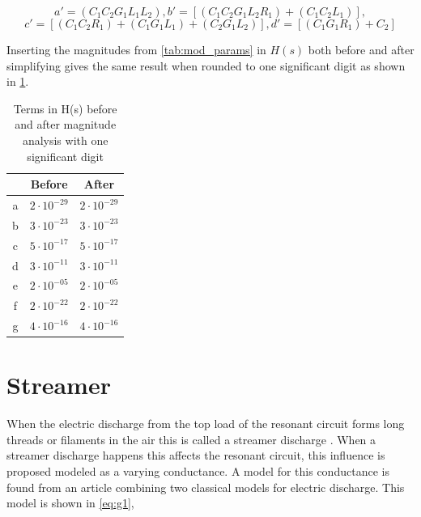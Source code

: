\begin{equation} \label{eq:ab_simp}
    a' = (C_1 C_2 G_1 L_1 L_2), b' = [(C_1 C_2 G_1 L_2 R_1)+(C_1 C_2 L_1)],
\end{equation}
\begin{equation} \label{eq:cd_simp}
    c' = [(C_1 C_2 R_1)+(C_1 G_1 L_1)+(C_2 G_1 L_2)], d' = [(C_1 G_1 R_1) + C_2]
\end{equation}

Inserting the magnitudes from \cref{tab:mod_params} in $H(s)$ both before and after simplifying gives the same result when rounded to one significant digit as shown in \cref{tab:beforeafter}.

\begin{table}[h!]
    \centering
    \begin{tabular}{c|c|c}
          & Before             & After \\ \hline
        a & $2 \cdot 10^{-29}$ & $2 \cdot 10^{-29}$ \\
        b & $3 \cdot 10^{-23}$ & $3 \cdot 10^{-23}$ \\
        c & $5 \cdot 10^{-17}$ & $5 \cdot 10^{-17}$ \\
        d & $3 \cdot 10^{-11}$ & $3 \cdot 10^{-11}$ \\
        e & $2 \cdot 10^{-05}$ & $2 \cdot 10^{-05}$ \\
        f & $2 \cdot 10^{-22}$ & $2 \cdot 10^{-22}$ \\
        g & $4 \cdot 10^{-16}$ & $4 \cdot 10^{-16}$ \\
    \end{tabular}
    \caption{Terms in H(s) before and after magnitude analysis with one significant digit}
    \label{tab:beforeafter}
\end{table}


\section{Streamer}
\label{sec:arc}

When the electric discharge from the top load of the resonant circuit forms long threads or filaments in the air this is called a streamer discharge \citep{streamer}. When a streamer discharge happens this affects the resonant circuit, this influence is proposed modeled as a varying conductance. A model for this conductance is found from an article \citep{575670} combining two classical models for electric discharge. This model is shown in \cref{eq:g1},

